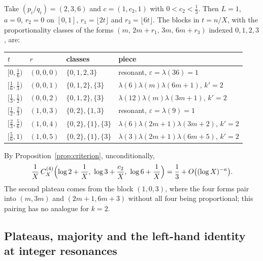 \begin{example}[$k=4$, closed unconditionally]
\label{ex:k4}
Take $(p_i/q_i)=(2,3,6)$ and $c=(1,c_2,1)$ with $0<c_2<\tfrac13$. Then $L=1$, $a=0$, $r_2=0$ on $[0,1]$, $r_1=\lfloor2t\rfloor$ and $r_3=\lfloor6t\rfloor$. The blocks in $t=n/X$, with the proportionality classes of the forms $(m,\,2m+r_1,\,3m,\,6m+r_3)$ indexed $0,1,2,3$, are:
\begin{center}
\small
\begin{tabular}{llll}
\hline
$t$ & $r$ & classes & piece\\
\hline
$[0,\tfrac16)$ & $(0,0,0)$ & $\{0,1,2,3\}$ & resonant, $\varepsilon=\lambda(36)=1$\\
$[\tfrac16,\tfrac13)$ & $(0,0,1)$ & $\{0,1,2\},\{3\}$ & $\lambda(6)\lambda(m)\lambda(6m+1)$, $k'=2$\\
$[\tfrac13,\tfrac12)$ & $(0,0,2)$ & $\{0,1,2\},\{3\}$ & $\lambda(12)\lambda(m)\lambda(3m+1)$, $k'=2$\\
$[\tfrac12,\tfrac23)$ & $(1,0,3)$ & $\{0,2\},\{1,3\}$ & resonant, $\varepsilon=\lambda(9)=1$\\
$[\tfrac23,\tfrac56)$ & $(1,0,4)$ & $\{0,2\},\{1\},\{3\}$ & $\lambda(6)\lambda(2m+1)\lambda(3m+2)$, $k'=2$\\
$[\tfrac56,1)$ & $(1,0,5)$ & $\{0,2\},\{1\},\{3\}$ & $\lambda(3)\lambda(2m+1)\lambda(6m+5)$, $k'=2$\\
\hline
\end{tabular}
\end{center}
By Proposition~\ref{prop:criterion}, unconditionally,
\begin{equation}
\frac1X\,C^{(4)}_X\Bigl(\log2+\frac1X,\ \log3+\frac{c_2}X,\ \log6+\frac1X\Bigr)=\frac13+O\bigl((\log X)^{-\kappa}\bigr).
\label{eq:ex4}
\end{equation}
The second plateau comes from the block $(1,0,3)$, where the four forms pair into $(m,3m)$ and $(2m+1,6m+3)$ without all four being proportional; this pairing has no analogue for $k=2$.
\end{example}

\subsection{Plateaus, majority and the left-hand identity at integer resonances}
\label{subsec:kpoint_integer}

